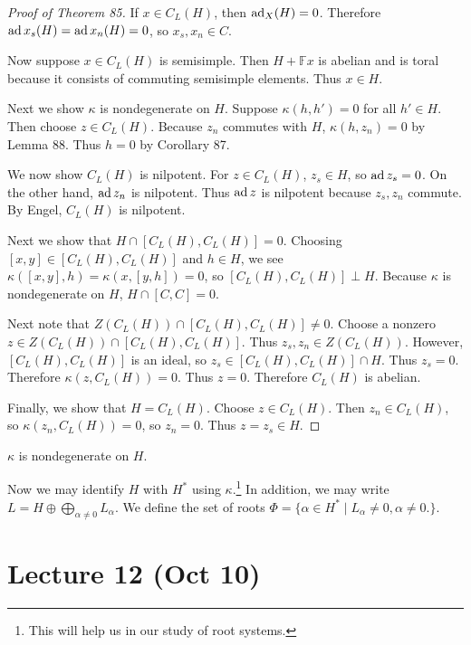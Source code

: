 \documentclass[twoside, 10pt]{article}
\newcommand{\F}{\mathbb{F}}
\begin{document}
    \begin{proof}[Proof of Theorem 85] If $x \in C_L(H)$, then $\operatorname{ad}_X(H) = 0$.
        Therefore $\operatorname{ad} x_s(H) = \operatorname{ad} x_n(H) = 0$, so $x_s, x_n \in C$.

        Now suppose $x \in C_L(H)$ is semisimple. Then $H + \F x$ is abelian
        and is toral because it consists of commuting semisimple elements. Thus
        $x \in H$.

        Next we show $\kappa$ is nondegenerate on $H$. Suppose $\kappa(h,h') =
        0$ for all $h' \in H$. Then choose $z \in C_L(H)$. Because $z_n$
        commutes with $H$, $\kappa(h,z_n) = 0$ by Lemma 88. Thus $h = 0$ by
        Corollary 87.

        We now show $C_L(H)$ is nilpotent. For $z \in C_L(H)$, $z_s \in H$, so
        $\operatorname{ad} z_s = 0$. On the other hand, $\operatorname{ad} z_n$ is nilpotent. Thus $\operatorname{ad} z$
        is nilpotent because $z_s, z_n$ commute. By Engel, $C_L(H)$ is
        nilpotent.

        Next we show that $H \cap [C_L(H),C_L(H)] = 0$. Choosing $[x,y] \in
        [C_L(H),C_L(H)]$ and $h \in H$, we see $\kappa([x,y],h) =
        \kappa(x,[y,h]) = 0$, so $[C_L(H),C_L(H)] \perp H$. Because $\kappa$ is
        nondegenerate on $H$, $H \cap [C,C] = 0$.

        Next note that $Z(C_L(H)) \cap [C_L(H),C_L(H)] \neq 0$. Choose a
        nonzero $z \in Z(C_L(H)) \cap [C_L(H), C_L(H)]$. Thus $z_s,z_n \in
        Z(C_L(H))$. However, $[C_L(H), C_L(H)]$ is an ideal, so $z_s \in
        [C_L(H), C_L(H)] \cap H$. Thus $z_s = 0$. Therefore $\kappa(z,C_L(H)) =
        0$. Thus $z = 0$. Therefore $C_L(H)$ is abelian.

        Finally, we show that $H = C_L(H)$. Choose $z \in C_L(H)$. Then $z_n
    \in C_L(H)$, so $\kappa(z_n,C_L(H)) = 0$, so $z_n = 0$. Thus $z = z_s \in
H$.  \end{proof}

    \begin{cor} $\kappa$ is nondegenerate on $H$.  \end{cor}
     
    Now we may identify $H$ with $H^*$ using $\kappa$.\footnote{This will help
    us in our study of root systems.} In addition, we may write $L = H \oplus
    \bigoplus_{\alpha \neq 0}L_{\alpha}$. We define the set of roots $\Phi = \{
    \alpha \in H^* \mid L_{\alpha} \neq 0, \alpha \neq 0.\}$.

    \section{Lecture 12 (Oct 10)}%
    
\end{document}
